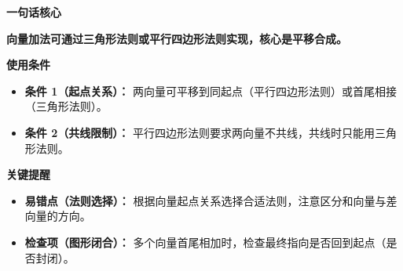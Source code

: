 \begin{summarybox}
	\textbf{\textcolor{CSummary}{一句话核心}}

	\textbf{向量加法可通过三角形法则或平行四边形法则实现，核心是平移合成。}

	\medskip
	\textbf{\textcolor{CSummary}{使用条件}}
	\begin{itemize}[leftmargin=*, itemsep=0.5em, topsep=0.4em]
		\item \textbf{条件 1（起点关系）：} 两向量可平移到同起点（平行四边形法则）或首尾相接（三角形法则）。
		\item \textbf{条件 2（共线限制）：} 平行四边形法则要求两向量不共线，共线时只能用三角形法则。
	\end{itemize}

	\medskip
	\textbf{\textcolor{CSummary}{关键提醒}}
	\begin{itemize}[leftmargin=*, itemsep=0.5em, topsep=0.4em]
		\item \textbf{易错点（法则选择）：} 根据向量起点关系选择合适法则，注意区分和向量与差向量的方向。
		\item \textbf{检查项（图形闭合）：} 多个向量首尾相加时，检查最终指向是否回到起点（是否封闭）。
	\end{itemize}
\end{summarybox}
